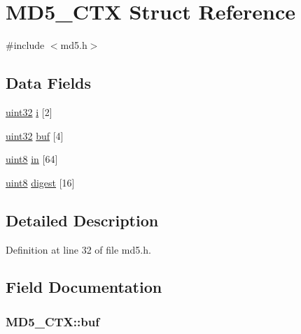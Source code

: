 \hypertarget{structMD5__CTX}{
\section{MD5\_\-CTX Struct Reference}
\label{structMD5__CTX}
}


{\ttfamily \#include $<$md5.h$>$}

\subsection*{Data Fields}
\begin{DoxyCompactItemize}
\item 
\hyperlink{int__types_8h_a1134b580f8da4de94ca6b1de4d37975e}{uint32} \hyperlink{structMD5__CTX_a390f9af4ccdea5b2b06a198d3fbcb3be}{i} \mbox{[}2\mbox{]}
\item 
\hyperlink{int__types_8h_a1134b580f8da4de94ca6b1de4d37975e}{uint32} \hyperlink{structMD5__CTX_a09970d6085377e045bfd7e6e0da8e899}{buf} \mbox{[}4\mbox{]}
\item 
\hyperlink{int__types_8h_adde6aaee8457bee49c2a92621fe22b79}{uint8} \hyperlink{structMD5__CTX_aed4b3af3540834b37fc5d6909eefec96}{in} \mbox{[}64\mbox{]}
\item 
\hyperlink{int__types_8h_adde6aaee8457bee49c2a92621fe22b79}{uint8} \hyperlink{structMD5__CTX_a3fd397dba8ec1fbab19a46ac97fa131e}{digest} \mbox{[}16\mbox{]}
\end{DoxyCompactItemize}


\subsection{Detailed Description}


Definition at line 32 of file md5.h.



\subsection{Field Documentation}
\hypertarget{structMD5__CTX_a09970d6085377e045bfd7e6e0da8e899}{
\subsubsection[{buf}]{ {\bf MD5\_\-CTX::buf}}}
\label{structMD5__CTX_a09970d6085377e045bfd7e6e0da8e899}


